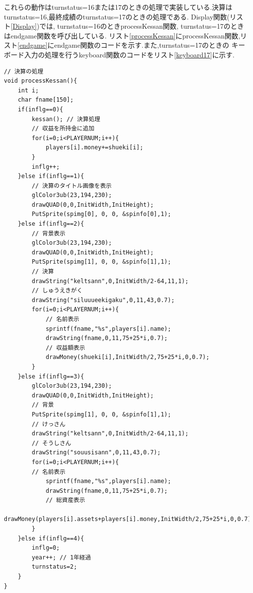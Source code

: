 \documentclass[a4j]{jarticle}
\begin{document}
        これらの動作はturnstatus=16または17のときの処理で実装している.決算はturnstatus=16,最終成績のturnstatus=17のときの処理である.
        Display関数(リスト\ref{Display})では, turnstatus=16のときprocessKessan関数, turnstatus=17のときはendgame関数を呼び出している.
        リスト\ref{processKessan}にprocessKessan関数,リスト\ref{endgame}にendgame関数のコードを示す.また,turnstatus=17のときの
        キーボード入力の処理を行うkeyboard関数のコードをリスト\ref{keyboard17}に示す.
        \begin{lstlisting}[basicstyle=\ttfamily\footnotesize, frame=single,label=processKessan,caption=processKessan関数]
// 決算の処理
void processKessan(){
    int i;
    char fname[150];
    if(inflg==0){
        kessan(); // 決算処理
        // 収益を所持金に追加
        for(i=0;i<PLAYERNUM;i++){
            players[i].money+=shueki[i];
        }
        inflg++;
    }else if(inflg==1){
        // 決算のタイトル画像を表示
        glColor3ub(23,194,230);
        drawQUAD(0,0,InitWidth,InitHeight);
        PutSprite(spimg[0], 0, 0, &spinfo[0],1);           
    }else if(inflg==2){
        // 背景表示
        glColor3ub(23,194,230);
        drawQUAD(0,0,InitWidth,InitHeight);
        PutSprite(spimg[1], 0, 0, &spinfo[1],1);
        // 決算
        drawString("keltsann",0,InitWidth/2-64,11,1);
        // しゅうえきがく
        drawString("siluuueekigaku",0,11,43,0.7);
        for(i=0;i<PLAYERNUM;i++){
            // 名前表示
            sprintf(fname,"%s",players[i].name);
            drawString(fname,0,11,75+25*i,0.7);
            // 収益額表示
            drawMoney(shueki[i],InitWidth/2,75+25*i,0,0.7);
        }            
    }else if(inflg==3){
        glColor3ub(23,194,230);
        drawQUAD(0,0,InitWidth,InitHeight);
        // 背景
        PutSprite(spimg[1], 0, 0, &spinfo[1],1);
        // けっさん
        drawString("keltsann",0,InitWidth/2-64,11,1);
        // そうしさん
        drawString("souusisann",0,11,43,0.7);
        for(i=0;i<PLAYERNUM;i++){
        // 名前表示
            sprintf(fname,"%s",players[i].name);
            drawString(fname,0,11,75+25*i,0.7);
            // 総資産表示
            drawMoney(players[i].assets+players[i].money,InitWidth/2,75+25*i,0,0.7);
        }
    }else if(inflg==4){
        inflg=0;
        year++; // 1年経過
        turnstatus=2;
    }
}
        \end{lstlisting}
\end{document}
